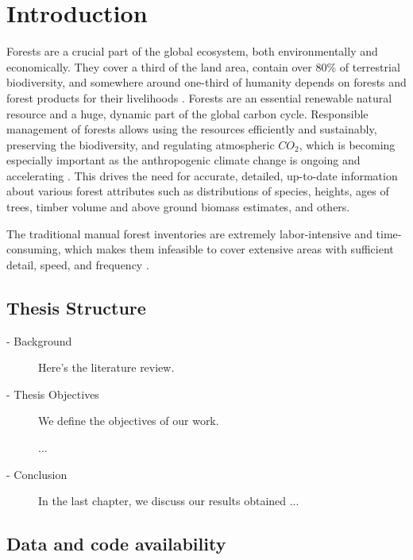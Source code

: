 \chapter{Introduction}

Forests are a crucial part of the global ecosystem, both environmentally and economically.
They cover a third of the land area, contain over 80\% of terrestrial biodiversity, and somewhere around one-third of humanity depends on forests and forest products for their livelihoods \cite{aertsForestRestorationBiodiversity2011,StateWorldsForests2020}.
Forests are an essential renewable natural resource and a huge, dynamic part of the global carbon cycle.
Responsible management of forests allows using the resources efficiently and sustainably, preserving the biodiversity, and regulating atmospheric $CO_2$, which is becoming especially important as the anthropogenic climate change is ongoing and accelerating \cite{faheyForestCarbonStorage2010,forsterIndicatorsGlobalClimate2024}.
This drives the need for accurate, detailed, up-to-date information about various forest attributes such as distributions of species, heights, ages of trees, timber volume and above ground biomass estimates, and others.

The traditional manual forest inventories are extremely labor-intensive and time-consuming, which makes them infeasible to cover extensive areas with sufficient detail, speed, and frequency \cite{burleyEncyclopediaForestSciences2004}.



\section{Thesis Structure}

\begin{description}
    \item[ - Background]
Here's the literature review.

    \item[ - Thesis Objectives]
We define the objectives of our work.

...

    \item[ - Conclusion]
In the last chapter, we discuss our results obtained ...

\end{description}

\section{Data and code availability}

